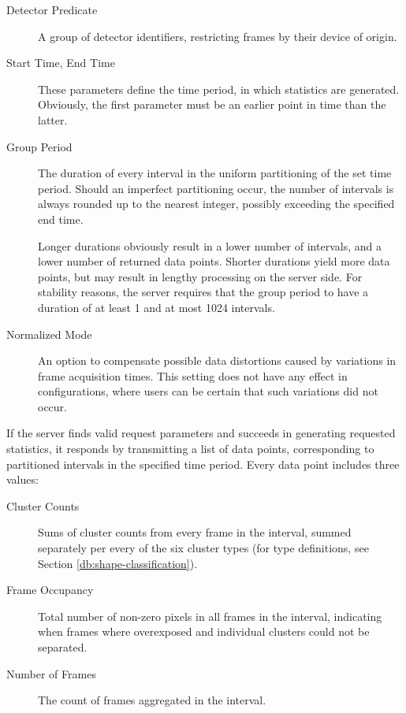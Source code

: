 \begin{description}
	\item[Detector Predicate]
	A group of detector identifiers, restricting frames by their device of origin.

	\item[Start Time, End Time]
	These parameters define the time period, in which statistics are generated. Obviously, the first parameter must be an earlier point in time than the latter.

	\item[Group Period]
	The duration of every interval in the uniform partitioning of the set time period. Should an imperfect partitioning occur, the number of intervals is always rounded up to the nearest integer, possibly exceeding the specified end time.

	Longer durations obviously result in a lower number of intervals, and a lower number of returned data points. Shorter durations yield more data points, but may result in lengthy processing on the server side. For stability reasons, the server requires that the group period to have a duration of at least 1 and at most 1024 intervals.

	\item[Normalized Mode]
	An option to compensate possible data distortions caused by variations in frame acquisition times. This setting does not have any effect in configurations, where users can be certain that such variations did not occur.
\end{description}

If the server finds valid request parameters and succeeds in generating requested statistics, it responds by transmitting a list of data points, corresponding to partitioned intervals in the specified time period. Every data point includes three values:

\begin{description}
	\item[Cluster Counts]
	Sums of cluster counts from every frame in the interval, summed separately per every of the six cluster types (for type definitions, see Section \ref{db:shape-classification}).

	\item[Frame Occupancy]
	Total number of non-zero pixels in all frames in the interval, indicating when frames where overexposed and individual clusters could not be separated.

	\item[Number of Frames]
	The count of frames aggregated in the interval.
\end{description}

